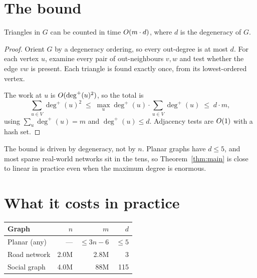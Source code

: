 \documentclass[11pt]{article}
\begin{document}
\section{The bound}

\begin{theorem}
\label{thm:main}
Triangles in $G$ can be counted in time $O(m \cdot d)$, where $d$ is the
degeneracy of $G$.
\end{theorem}

\begin{proof}
Orient $G$ by a degeneracy ordering, so every out-degree is at most $d$. For
each vertex $u$, examine every pair of out-neighbours $v, w$ and test whether
the edge $vw$ is present. Each triangle is found exactly once, from its
lowest-ordered vertex.

The work at $u$ is $O(\deg^{+}(u)^2)$, so the total is
\begin{equation}
  \sum_{u \in V} \deg^{+}(u)^2
    \;\le\; \max_{u} \deg^{+}(u) \cdot \sum_{u \in V} \deg^{+}(u)
    \;\le\; d \cdot m,
  \label{eq:sum}
\end{equation}
using $\sum_u \deg^{+}(u) = m$ and $\deg^{+}(u) \le d$. Adjacency tests are
$O(1)$ with a hash set.
\end{proof}

\begin{remark}
The bound is driven by degeneracy, not by $n$. Planar graphs have $d \le 5$,
and most sparse real-world networks sit in the tens, so
Theorem~\ref{thm:main} is close to linear in practice even when the maximum
degree is enormous.
\end{remark}

\section{What it costs in practice}

\begin{center}
\begin{tabular}{lrrr}
\hline
Graph & $n$ & $m$ & $d$ \\
\hline
Planar (any)      & ---       & $\le 3n-6$  & $\le 5$ \\
Road network      & 2.0M      & 2.8M        & 3 \\
Social graph      & 4.0M      & 88M         & 115 \\
\hline
\end{tabular}
\end{center}
\end{document}
